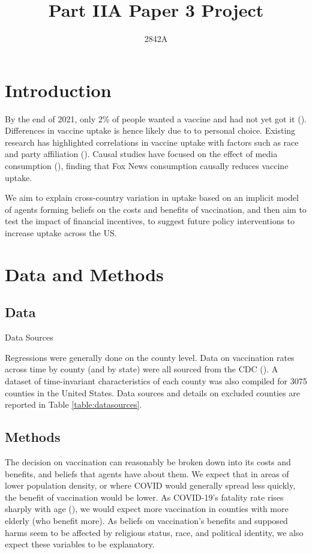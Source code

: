 \documentclass[12pt]{article}
\title{Part IIA Paper 3 Project}
\author{
	2842A
}
\newcommand\wordcount{
	\immediate\write18{texcount -sum -1 \jobname.tex > count.txt} 
	
}
\begin{document}
	
	\begin{spacing}{1.5} %
		\section{Introduction}
		By the end of 2021, only 2\% of people wanted a vaccine and had not yet got it (\cite{kff_kff_2022}). Differences in vaccine uptake is hence likely due to to personal choice. Existing research has highlighted correlations in vaccine uptake with factors such as race and party affiliation (\cite{viswanath_individual_2021}). Causal studies have focused on the effect of media consumption (\cite{pinna_cable_2021}), finding that Fox News consumption causally reduces vaccine uptake.
		
		We aim to explain cross-country variation in uptake based on an implicit model of agents forming beliefs on the costs and benefits of vaccination, and then aim to test the impact of financial incentives, to suggest future policy interventions to increase uptake across the US.
		
		\section{Data and Methods}
		\subsection{Data}
		
		\begin{table}
			\caption{Data Sources}
			
			\label{table:datasources}
		\end{table}
	
		Regressions were generally done on the county level. Data on vaccination rates across time by county (and by state) were all sourced from the CDC (\cite{cdc_covid-19_2022}). A dataset of time-invariant characteristics of each county was also compiled for 3075 counties in the United States. Data sources and details on excluded counties are reported in Table \ref{table:datasources}.
		
		\subsection{Methods}
		The decision on vaccination can reasonably be broken down into its costs and benefits, and beliefs that agents have about them. We expect that in areas of lower population density, or where COVID would generally spread less quickly, the benefit of vaccination would be lower. As COVID-19's fatality rate rises sharply with age (\cite{levin_assessing_2020}), we would expect more vaccination in counties with more elderly (who benefit more). As beliefs on vaccination's benefits and supposed harms seem to be affected by religious status, race, and political identity, we also expect these variables to be explanatory.
		

\end{spacing}
\end{document}
